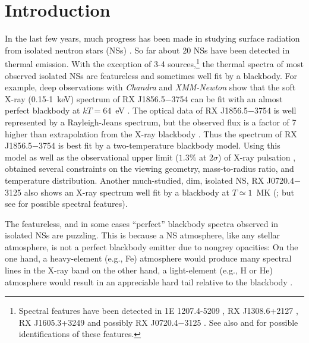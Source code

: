 \documentclass{emulateapj}
\begin{document}


\section{Introduction}

In the last few years, much progress has been made in studying surface
radiation from isolated neutron stars (NSs) 
\citep[see, e.g.,][for a review]{PZ03}. 
So far about 20 NSs have been detected in thermal emission.
\setcounter{footnote}{4}
With the exception of 3-4 sources,\footnote{Spectral 
features have been detected in 1E 1207.4-5209 
\citep{sanwaletal02,mereghettietal02,haileymori02,DeLuca-ea},
RX J1308.6+2127 \citep{Haberl-ea03}, 
RX J1605.3+3249 \citep{Kerkwijk04} 
and possibly 
RX J0720.4$-$3125 \citep{Haberl-ea04a}. 
See also \citet{morihailey03} and \citet{HoLai04} 
for possible identifications of these features.}
the thermal spectra of most observed isolated NSs are featureless and 
sometimes well fit by a blackbody. 
For example, deep observations with
\textit{Chandra} and \textit{XMM-Newton} show that the soft X-ray (0.15-1~keV)
spectrum of RX J1856.5$-$3754 \citep{Walter-ea} can be fit with an almost perfect blackbody
at $kT=64$~eV \citep[e.g.,][]{Drake-ea,Burwitz-ea03}. 
The optical data of RX J1856.5$-$3754 is well represented
by a Rayleigh-Jeans spectrum, but the observed flux is a factor of
7 higher than extrapolation from the X-ray blackbody 
\citep[see][]{ponsetal02}. 
Thus the spectrum of RX J1856.5$-$3754 
is best fit by a two-temperature
blackbody model. Using this model as well as the 
observational upper limit ($1.3\%$ at $2\sigma$) 
of X-ray pulsation \citep{Burwitz-ea03}, \citet{BrajeRomani} 
obtained
several constraints on the viewing geometry, mass-to-radius ratio,
and temperature distribution.
Another much-studied, dim, isolated NS, RX J0720.4$-$3125
also shows an X-ray spectrum well fit by a blackbody at $T\simeq 1$~MK
(\citealt{Paerels-ea01}; but see \citealt{Haberl-ea04a} 
for possible spectral features).

The featureless, and in some cases ``perfect'' blackbody spectra
observed in isolated NSs are puzzling. This is because a NS atmosphere, 
like any stellar atmosphere, is not a perfect blackbody emitter 
due to nongrey opacities: On the one hand, a heavy-element (e.g., Fe) 
atmosphere would produce many spectral lines in the X-ray band 
\citep[e.g.,][]{RajagopalRomani,ponsetal02} 
on the other hand, a light-element
(e.g., H or He) atmosphere would result in an appreciable hard tail relative 
to the blackbody \citep[e.g.,][]{Shibanov-ea}. 
\end{document}
